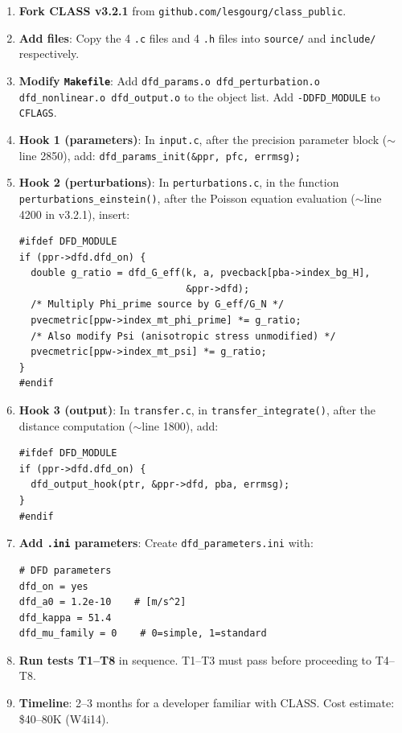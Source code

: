 \documentclass[11pt]{article}
\theoremstyle{definition}
\theoremstyle{remark}
\begin{document}
\begin{enumerate}
\item \textbf{Fork CLASS v3.2.1} from \texttt{github.com/lesgourg/class\_public}.

\item \textbf{Add files}: Copy the 4 \texttt{.c} files and 4 \texttt{.h}
  files into \texttt{source/} and \texttt{include/} respectively.

\item \textbf{Modify \texttt{Makefile}}: Add \texttt{dfd\_params.o
  dfd\_perturbation.o dfd\_nonlinear.o dfd\_output.o} to the object list.
  Add \texttt{-DDFD\_MODULE} to \texttt{CFLAGS}.

\item \textbf{Hook 1 (parameters)}: In \texttt{input.c}, after the
  precision parameter block ($\sim$line 2850), add:
  \texttt{dfd\_params\_init(\&ppr, pfc, errmsg);}

\item \textbf{Hook 2 (perturbations)}: In \texttt{perturbations.c},
  in the function \texttt{perturbations\_einstein()}, after the
  Poisson equation evaluation ($\sim$line 4200 in v3.2.1), insert:
\begin{lstlisting}[numbers=none]
#ifdef DFD_MODULE
if (ppr->dfd.dfd_on) {
  double g_ratio = dfd_G_eff(k, a, pvecback[pba->index_bg_H],
                             &ppr->dfd);
  /* Multiply Phi_prime source by G_eff/G_N */
  pvecmetric[ppw->index_mt_phi_prime] *= g_ratio;
  /* Also modify Psi (anisotropic stress unmodified) */
  pvecmetric[ppw->index_mt_psi] *= g_ratio;
}
#endif
\end{lstlisting}

\item \textbf{Hook 3 (output)}: In \texttt{transfer.c}, in
  \texttt{transfer\_integrate()}, after the distance computation
  ($\sim$line 1800), add:
\begin{lstlisting}[numbers=none]
#ifdef DFD_MODULE
if (ppr->dfd.dfd_on) {
  dfd_output_hook(ptr, &ppr->dfd, pba, errmsg);
}
#endif
\end{lstlisting}

\item \textbf{Add \texttt{.ini} parameters}: Create
  \texttt{dfd\_parameters.ini} with:
\begin{lstlisting}[language={},numbers=none]
# DFD parameters
dfd_on = yes
dfd_a0 = 1.2e-10    # [m/s^2]
dfd_kappa = 51.4
dfd_mu_family = 0    # 0=simple, 1=standard
\end{lstlisting}

\item \textbf{Run tests T1--T8} in sequence. T1--T3 must pass before
  proceeding to T4--T8.

\item \textbf{Timeline}: 2--3 months for a developer familiar with CLASS.
  Cost estimate: \$40--80K (W4i14).
\end{enumerate}
\end{document}

